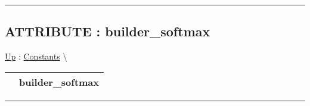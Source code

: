 \par


\rule{\linewidth}{0.5pt}
\subsection*{ATTRIBUTE : builder\_softmax}
\hypertarget{ecldoc:logisticregression.constants.builder_softmax}{}
\hyperlink{ecldoc:LogisticRegression.Constants}{Up} :
\hspace{0pt} \hyperlink{ecldoc:LogisticRegression.Constants}{Constants} \textbackslash 

{\renewcommand{\arraystretch}{1.5}
\begin{tabularx}{\textwidth}{|>{\raggedright\arraybackslash}l|X|}
\hline
\hspace{0pt} & builder\_softmax \\
\hline
\end{tabularx}
}

\par


\rule{\linewidth}{0.5pt}



